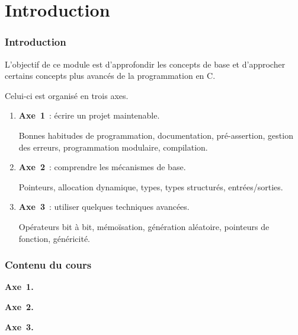 
\section*{Introduction}

\begin{frame} \frametitle{Introduction}
L'objectif de ce module est d'approfondir les concepts de base et 
d'approcher certains concepts plus avancés de la programmation en {\sf C}.
\bigskip

Celui-ci est organisé en trois axes.
\medskip

\begin{enumerate}
    \item {\bf Axe~1}~: \alert{écrire un projet maintenable}.
    \medskip
    
    Bonnes habitudes de programmation, documentation, pré-assertion,
    gestion des erreurs, programmation modulaire, compilation.
    \bigskip
    
    \item {\bf Axe~2}~: \alert{comprendre les mécanismes de base}.
    \medskip
    
    Pointeurs, allocation dynamique, types, types structurés, entrées/sorties.
    \bigskip
    
    \item {\bf Axe~3}~: \alert{utiliser quelques techniques avancées}.
    \medskip
    
    Opérateurs bit à bit, mémoïsation, génération aléatoire, pointeurs
    de fonction, généricité.
\end{enumerate}
\end{frame}

\begin{frame} \frametitle{Contenu du cours}
\begin{multicols}{3}
    \begin{footnotesize}
        {\large \bf Axe~1.}
        \tableofcontents[hideallsubsections,part=1]
        \bigskip

        {\large \bf Axe~2.}
        \tableofcontents[hideallsubsections,part=2]
        \bigskip
        
        {\large \bf Axe~3.}
        \tableofcontents[hideallsubsections,part=3]
    \end{footnotesize}
\end{multicols}
\end{frame}

